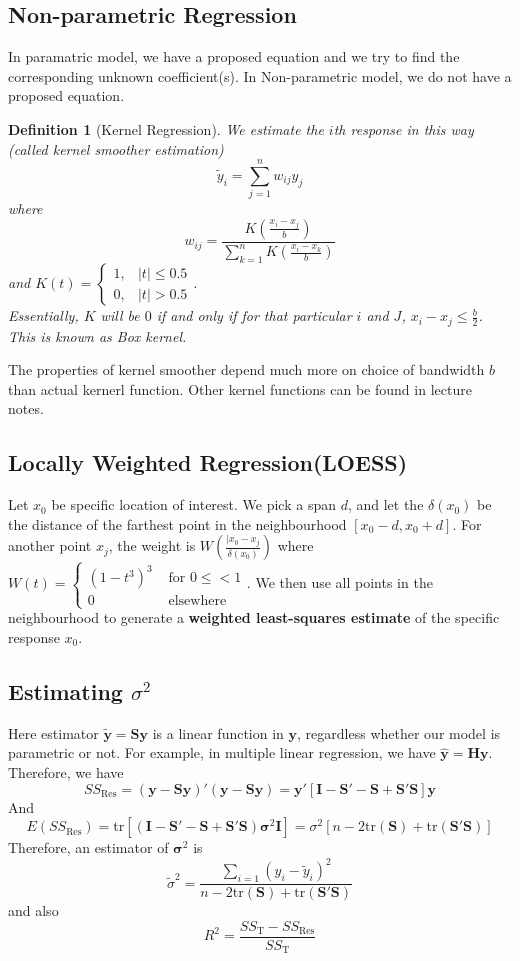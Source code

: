 \documentclass[11pt]{article}
\newcommand{\tr}{\mathrm{tr}}
\newtheorem{definition}{Definition}[section]
\theoremstyle{definition}
\begin{document}
\subsection{Non-parametric Regression}
In paramatric model, we have a proposed equation and we try to find the corresponding unknown coefficient(s). In Non-parametric model, we do not have a proposed equation.
\begin{definition}[Kernel Regression]
\normalfont We estimate the $i$th response in this way (called kernel smoother estimation)
\[
\tilde{y}_i=\sum_{j=1}^n w_{ij}y_j
\] 
where 
\[
w_{ij}=\frac{K(\frac{x_{i}-x_{j}}{b})}{\sum_{k=1}^n K(\frac{x_{i}-x_{k}}{b})}
\]
and $K(t)=\begin{cases} 1, &|t|\leq 0.5\\0, & |t|>0.5\end{cases}$.\\
Essentially, $K$ will be $0$ if and only if for that particular $i$ and $J$, $x_i-x_j\leq \frac{b}{2}$. This is known as Box kernel.
\end{definition}
The properties of kernel smoother depend much more on choice of bandwidth $b$ than actual kernerl function. Other kernel functions can be found in lecture notes.
\subsection{Locally Weighted Regression(LOESS)}
Let $x_0$ be specific location of interest. We pick a span $d$, and let the $\delta(x_0)$ be the distance of the farthest point in the neighbourhood $[x_0-d,x_0+d]$. For another point $x_j$, the weight is $W(\frac{|x_0-x_j}{\delta(x_0)})$ where $W(t)=\begin{cases} (1-t^3)^3 &\text{ for }0\leq <1\\0&\text{ elsewhere}\end{cases}$.
We then use all points in the neighbourhood to generate a \textbf{weighted least-squares estimate} of the specific response $x_0$.
\subsection{Estimating {$\sigma^2$}}
Here estimator $\tilde{\bm{y}}=\bm{Sy}$ is a linear function in $\bm{y}$, regardless whether our model is parametric or not. For example, in multiple linear regression, we have $\hat{\bm{y}}=\bm{Hy}$.\\
Therefore, we have 
\[
SS_\text{Res}=(\bm{y}-\bm{Sy})'(\bm{y}-\bm{Sy})=\bm{y}'[\bm{I}-\bm{S}'-\bm{S}+\bm{S}'\bm{S}]\bm{y}
\]
And
\[
E(SS_\text{Res})=\tr[(\bm{I}-\bm{S}'-\bm{S}+\bm{S}'\bm{S})\bm{\sigma}^2\bm{I}]=\sigma^2[n-2\tr(\bm{S})+\tr(\bm{S}'\bm{S})]
\]
Therefore, an estimator of $\bm{\sigma}^2$ is
\[
\tilde{\sigma}^2=\frac{\sum_{i=1}(y_i-\tilde{y}_i)^2}{n-2\tr(\bm{S})+\tr(\bm{S}'\bm{S})}
\]
and also
\[
R^2=\frac{SS_\text{T}-SS_\text{Res}}{SS_\text{T}}
\]
\end{document}
